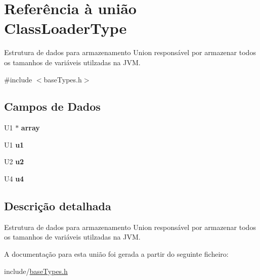 \hypertarget{unionClassLoaderType}{}\section{Referência à união Class\+Loader\+Type}
\label{unionClassLoaderType}


Estrutura de dados para armazenamento Union responsável por armazenar todos os tamanhos de variáveis utilzadas na J\+VM.  




{\ttfamily \#include $<$base\+Types.\+h$>$}

\subsection*{Campos de Dados}
\begin{DoxyCompactItemize}
\item 
\mbox{\label{unionClassLoaderType_a35ae4ff3dac1fe01b69c3649e200790c}} 
U1 $\ast$ {\bfseries array}
\item 
\mbox{\label{unionClassLoaderType_ac3612ba54bfba5c4b856dcba8db1a8a8}} 
U1 {\bfseries u1}
\item 
\mbox{\label{unionClassLoaderType_aaf24600dbc4afe99210fa000bdb1e6d7}} 
U2 {\bfseries u2}
\item 
\mbox{\label{unionClassLoaderType_aad01cfe6aac48729f55425b67a70622e}} 
U4 {\bfseries u4}
\end{DoxyCompactItemize}


\subsection{Descrição detalhada}
Estrutura de dados para armazenamento Union responsável por armazenar todos os tamanhos de variáveis utilzadas na J\+VM. 

A documentação para esta união foi gerada a partir do seguinte ficheiro\+:\begin{DoxyCompactItemize}
\item 
include/\hyperlink{baseTypes_8h}{base\+Types.\+h}\end{DoxyCompactItemize}
